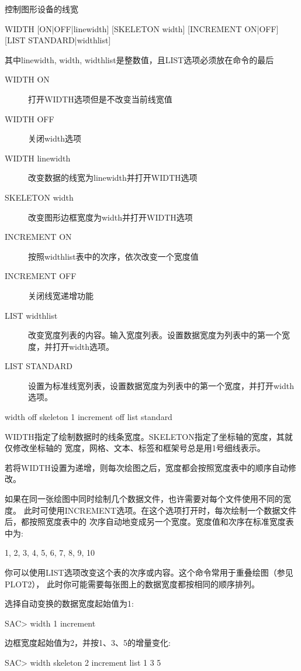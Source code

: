 \label{cmd:width}

控制图形设备的线宽

\begin{SACSTX}
WIDTH [ON|OFF|linewidth] [SKELETON width] [INCREMENT ON|OFF] 
    [LIST STANDARD|widthlist]
\end{SACSTX}
其中linewidth, width, widthlist是整数值，且LIST选项必须放在命令的最后

\begin{description}
\item [WIDTH ON] 打开WIDTH选项但是不改变当前线宽值
\item [WIDTH OFF] 关闭width选项
\item [WIDTH linewidth] 改变数据的线宽为linewidth并打开WIDTH选项
\item [SKELETON width] 改变图形边框宽度为width并打开WIDTH选项 
\item [INCREMENT ON] 按照widthlist表中的次序，依次改变一个宽度值 
\item [INCREMENT OFF] 关闭线宽递增功能 
\item [LIST widthlist] 改变宽度列表的内容。输入宽度列表。设置数据宽度为列表中的第一个宽度，并打开width选项。 
\item [LIST STANDARD] 设置为标准线宽列表，设置数据宽度为列表中的第一个宽度，并打开width选项。 
\end{description}

\begin{SACDFT}
width off skeleton 1 increment off list standard
\end{SACDFT}

WIDTH指定了绘制数据时的线条宽度。SKELETON指定了坐标轴的宽度，其就仅修改坐标轴的
宽度，网格、文本、标签和框架号总是用1号细线表示。

若将WIDTH设置为递增，则每次绘图之后，宽度都会按照宽度表中的顺序自动修改。

如果在同一张绘图中同时绘制几个数据文件，也许需要对每个文件使用不同的宽度。
此时可使用INCREMENT选项。在这个选项打开时，每次绘制一个数据文件后，都按照宽度表中的
次序自动地变成另一个宽度。宽度值和次序在标准宽度表中为:
\begin{SACCode}
1, 2, 3, 4, 5, 6, 7, 8, 9, 10
\end{SACCode}
你可以使用LIST选项改变这个表的次序或内容。这个命令常用于重叠绘图（参见PLOT2），
此时你可能需要每张图上的数据宽度都按相同的顺序排列。

选择自动变换的数据宽度起始值为1:
\begin{SACCode}
SAC> width 1 increment
\end{SACCode}

边框宽度起始值为2，并按1、3、5的增量变化:
\begin{SACCode}
SAC> width skeleton 2 increment list 1 3 5
\end{SACCode}

